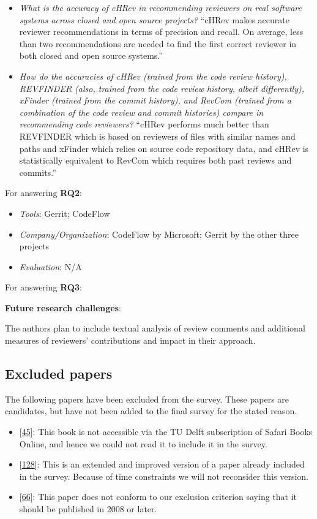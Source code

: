 \documentclass[]{book}
\providecommand{\tightlist}{%
  \setlength{\itemsep}{0pt}\setlength{\parskip}{0pt}}
\begin{document}
\begin{itemize}
\item
  \emph{What is the accuracy of cHRev in recommending reviewers on real
  software systems across closed and open source projects?} ``cHRev
  makes accurate reviewer recommendations in terms of precision and
  recall. On average, less than two recommendations are needed to find
  the first correct reviewer in both closed and open source systems.''
\item
  \emph{How do the accuracies of cHRev (trained from the code review
  history), REVFINDER (also, trained from the code review history,
  albeit differently), xFinder (trained from the commit history), and
  RevCom (trained from a combination of the code review and commit
  histories) compare in recommending code reviewers?} ``cHRev performs
  much better than REVFINDER which is based on reviewers of files with
  similar names and paths and xFinder which relies on source code
  repository data, and cHRev is statistically equivalent to RevCom which
  requires both past reviews and commits.''
\end{itemize}

For answering \textbf{RQ2}:

\begin{itemize}
\tightlist
\item
  \emph{Tools}: Gerrit; CodeFlow
\item
  \emph{Company/Organization}: CodeFlow by Microsoft; Gerrit by the
  other three projects
\item
  \emph{Evaluation}: N/A
\end{itemize}

For answering \textbf{RQ3}:

\textbf{Future research challenges}:

The authors plan to include textual analysis of review comments and
additional measures of reviewers' contributions and impact in their
approach.

\subsection{Excluded papers}\label{excluded-papers}

The following papers have been excluded from the survey. These papers
are candidates, but have not been added to the final survey for the
stated reason.

\begin{itemize}
\tightlist
\item
  {[}\protect\hyperlink{ref-cohen2010modern}{45}{]}: This book is not
  accessible via the TU Delft subscription of Safari Books Online, and
  hence we could not read it to include it in the survey.
\item
  {[}\protect\hyperlink{ref-mcintosh2016empirical}{128}{]}: This is an
  extended and improved version of a paper already included in the
  survey. Because of time constraints we will not reconsider this
  version.
\item
  {[}\protect\hyperlink{ref-fagan2002design}{66}{]}: This paper does not
  conform to our exclusion criterion saying that it should be published
  in 2008 or later.
\end{itemize}
\end{document}
